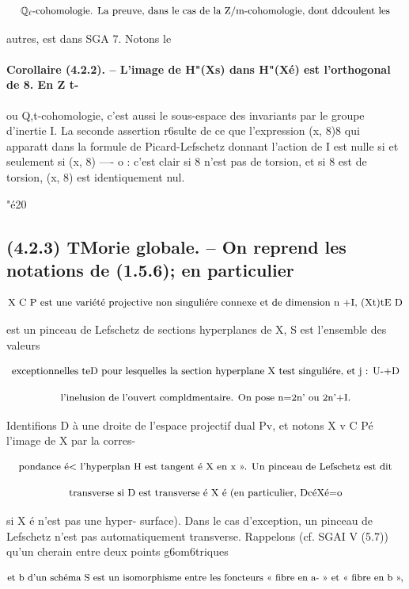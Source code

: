 \documentclass[11pt]{article}
\theoremstyle{remark}
\begin{document}
\[\text{\small \(\mathbb{Q}_{\ell}\)-cohomologie. La preuve, dans le cas de la Z/m-cohomologie, dont ddcoulent les}\]

autres, est dans SGA 7. Notons le

\paragraph{Corollaire (4.2.2). -- L'image de H"(Xs) dans H"(Xé) est l'orthogonal de 8. En Z t-}

ou Q,t-cohomologie, c'est aussi le sous-espace des invariants par le groupe d'inertie I. La seconde assertion r6sulte de ce que l'expression (x, 8)8 qui apparatt dans la formule de Picard-Lefschetz donnant l'action de I est nulle si et seulement si (x, 8) ---- o : c'est clair si 8 n'est pas de torsion, et si 8 est de torsion, (x, 8) est identiquement nul.

"é20

\subsection*{(4.2.3) TMorie globale. -- On reprend les notations de (1.5.6); en particulier}

\[\text{\small X C P est une variété projective non singuliére connexe et de dimension n +I, (Xt)tE D}\]

est un pinceau de Lefschetz de sections hyperplanes de X, S est l'ensemble des valeurs

\[\text{\small exceptionnelles teD pour lesquelles la section hyperplane X test singuliére, et j : U-+D}\]

\[\text{\small l'inelusion de l'ouvert compldmentaire. On pose n=2n' ou 2n'+I.}\]

Identifions D à une droite de l'espace projectif dual Pv, et notons X v C Pé l'image de X par la corres-

\[\text{\small pondance é< l'hyperplan H est tangent é X en x >>. Un pinceau de Lefschetz est dit}\]

\[\text{\small transverse si D est transverse é X é (en particulier, DcéXé=o}\]

si X é n'est pas une hyper- surface). Dans le cas d'exception, un pinceau de Lefschetz n'est pas automatiquement transverse. Rappelons (cf. SGAI V (5.7)) qu'un cherain entre deux points g6om6triques

\[\text{\small et b d'un schéma S est un isomorphisme entre les foncteurs << fibre en a- >> et << fibre en b >>,}\]
\end{document}
